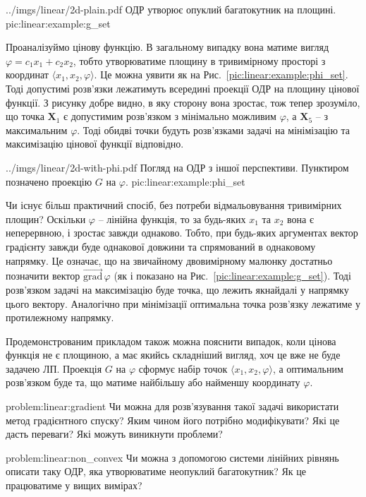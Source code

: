 \documentclass[\main/book.tex]{subfiles}
\begin{document}
\illustration
 {../imgs/linear/2d-plain.pdf}
 {ОДР утворює опуклий багатокутник на площині.}
 {pic:linear:example:g_set}

Проаналізуймо цінову функцію. В загальному випадку вона матиме вигляд $\varphi = c_1 x_1 + c_2 x_2$, тобто утворюватиме площину в тривимірному просторі з координат $\langle x_1, x_2, \varphi \rangle$. Це можна уявити як на Рис.~\ref{pic:linear:example:phi_set}. Тоді допустимі розв'язки лежатимуть всередині проекції ОДР на площину цінової функції. З рисунку добре видно, в яку сторону вона зростає, тож тепер зрозуміло, що точка $\mathbf{X}_1$ є допустимим розв'язком з мінімально можливим $\varphi$, а $\mathbf{X}_5$ -- з максимальним $\varphi$. Тоді обидві точки будуть розв'язками задачі на мінімізацію та максимізацію цінової функції відповідно.

\illustration
 {../imgs/linear/2d-with-phi.pdf}
 {Погляд на ОДР з іншої перспективи. Пунктиром позначено проекцію $G$ на $\varphi$.}
 {pic:linear:example:phi_set}

Чи існує більш практичний спосіб, без потреби відмальовування тривимірних площин? Оскільки $\varphi$ -- лінійна функція, то за будь-яких $x_1$ та $x_2$ вона є неперервною, і зростає завжди однаково. Тобто, при будь-яких аргументах вектор градієнту завжди буде однакової довжини та спрямований в однаковому напрямку. Це означає, що на звичайному двовимірному малюнку достатньо позначити вектор $\overrightarrow{\mathrm{grad}}\,\varphi$ (як і показано на Рис.~\ref{pic:linear:example:g_set}). Тоді розв'язком задачі на максимізацію буде точка, що лежить якнайдалі у напрямку цього вектору. Аналогічно при мінімізації оптимальна точка розв'язку лежатиме у протилежному напрямку.

\begin{note}
 Продемонстрованим прикладом також можна пояснити випадок, коли цінова функція не є площиною, а має якийсь складніший вигляд, хоч це вже не буде задачею ЛП. Проекція $G$ на $\varphi$ сформує набір точок $\langle x_1, x_2, \varphi \rangle$, а оптимальним розв'язком буде та, що матиме найбільшу або найменшу координату $\varphi$.
\end{note}

\begin{problem}{problem:linear:gradient}
 Чи можна для розв'язування такої задачі використати метод градієнтного спуску? Яким чином його потрібно модифікувати? Які це дасть переваги? Які можуть виникнути проблеми?
\end{problem}

\begin{problem}{problem:linear:non_convex}
 Чи можна з допомогою системи лінійних рівнянь описати таку ОДР, яка утворюватиме неопуклий багатокутник? Як це працюватиме у вищих вимірах?
\end{problem}
\end{document}
